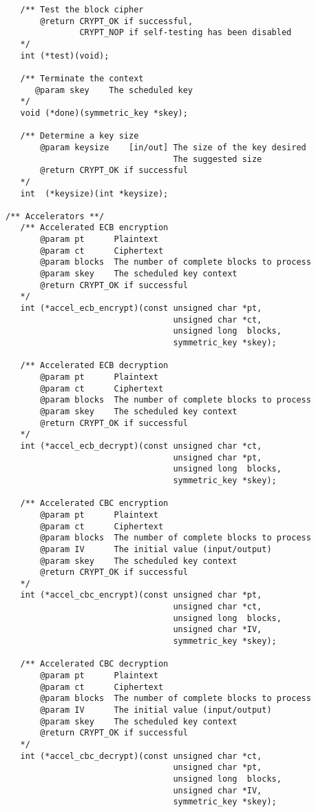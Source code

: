 \documentclass[synpaper]{book}
\begin{document}
\begin{small}
\begin{verbatim}
   /** Test the block cipher
       @return CRYPT_OK if successful,
               CRYPT_NOP if self-testing has been disabled
   */
   int (*test)(void);

   /** Terminate the context
      @param skey    The scheduled key
   */
   void (*done)(symmetric_key *skey);

   /** Determine a key size
       @param keysize    [in/out] The size of the key desired
                                  The suggested size
       @return CRYPT_OK if successful
   */
   int  (*keysize)(int *keysize);

/** Accelerators **/
   /** Accelerated ECB encryption
       @param pt      Plaintext
       @param ct      Ciphertext
       @param blocks  The number of complete blocks to process
       @param skey    The scheduled key context
       @return CRYPT_OK if successful
   */
   int (*accel_ecb_encrypt)(const unsigned char *pt,
                                  unsigned char *ct,
                                  unsigned long  blocks,
                                  symmetric_key *skey);

   /** Accelerated ECB decryption
       @param pt      Plaintext
       @param ct      Ciphertext
       @param blocks  The number of complete blocks to process
       @param skey    The scheduled key context
       @return CRYPT_OK if successful
   */
   int (*accel_ecb_decrypt)(const unsigned char *ct,
                                  unsigned char *pt,
                                  unsigned long  blocks,
                                  symmetric_key *skey);

   /** Accelerated CBC encryption
       @param pt      Plaintext
       @param ct      Ciphertext
       @param blocks  The number of complete blocks to process
       @param IV      The initial value (input/output)
       @param skey    The scheduled key context
       @return CRYPT_OK if successful
   */
   int (*accel_cbc_encrypt)(const unsigned char *pt,
                                  unsigned char *ct,
                                  unsigned long  blocks,
                                  unsigned char *IV,
                                  symmetric_key *skey);

   /** Accelerated CBC decryption
       @param pt      Plaintext
       @param ct      Ciphertext
       @param blocks  The number of complete blocks to process
       @param IV      The initial value (input/output)
       @param skey    The scheduled key context
       @return CRYPT_OK if successful
   */
   int (*accel_cbc_decrypt)(const unsigned char *ct,
                                  unsigned char *pt,
                                  unsigned long  blocks,
                                  unsigned char *IV,
                                  symmetric_key *skey);


\end{verbatim}
\end{small}
\end{document}
